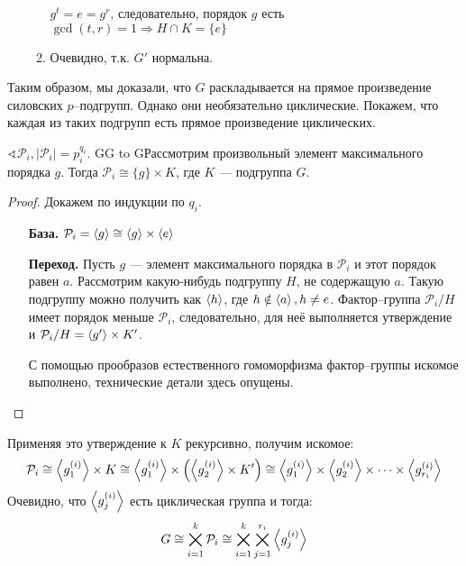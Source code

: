 \begin{solution}
\begin{itemize}
\begin{enumerate}
                        \(g^{t} = e = g^{r}\), следовательно, порядок \(g\) есть \(\gcd(t, r) = 1 \Rightarrow H \cap K = \{e\}\)
                  \item Очевидно, т.к. \(G'\) нормальна.
              \end{enumerate}
    \end{itemize}

    Таким образом, мы доказали, что \(G\) раскладывается на прямое произведение силовских \(p\)--подгрупп. Однако они необязательно циклические. Покажем, что каждая из таких подгрупп есть прямое произведение циклических.

    \begin{statement}
        \(\sphericalangle \mathcal{P}_i, |\mathcal{P}_i| = p_i^{q_i}\).  GG to GРассмотрим произвольный элемент максимального порядка \(g\). Тогда \(\mathcal{P}_i \cong \{g\} \times K\), где \(K\) --- подгруппа \(G\).
    \end{statement}
    \begin{proof}
        Докажем по индукции по \(q_i\).
        \begin{itemize}
            \item [\textbf{База.}] \(\mathcal{P}_i = \ev{g} \cong \ev{g} \times \ev{e}\)
            \item [\textbf{Переход.}] Пусть \(g\) --- элемент максимального порядка в \(\mathcal{P}_i\) и этот порядок равен \(a\). Рассмотрим какую-нибудь подгруппу \(H\), не содержащую \(a\). Такую подгруппу можно получить как \(\ev{h}\), где \(h \notin \ev{a}, h \neq e\). Фактор--группа \(\mathcal{P}_i / H\) имеет порядок меньше \(\mathcal{P}_i\), следовательно, для неё выполняется утверждение и \(\mathcal{P}_i / H = \ev{g'} \times K'\).

                  С помощью прообразов естественного гомоморфизма фактор--группы искомое выполнено, технические детали здесь опущены.
        \end{itemize}
    \end{proof}

    Применяя это утверждение к \(K\) рекурсивно, получим искомое:
    \[\mathcal{P}_i \cong \ev{g_1^{(i)}} \times K \cong \ev{g_1^{(i)}} \times \left(\ev{g_2^{(i)}} \times K'\right) \cong \ev{g_1^{(i)}} \times \ev{g_2^{(i)}} \times \dots \times \ev{g_{r_i}^{(i)}}\]
    Очевидно, что \(\ev{g_j^{(i)}}\) есть циклическая группа и тогда:
    \[G \cong \bigtimes_{i = 1}^k \mathcal{P}_i \cong \bigtimes_{i = 1}^k \bigtimes_{j = 1}^{r_i} \ev{g_j^{(i)}}\]
\end{solution}

